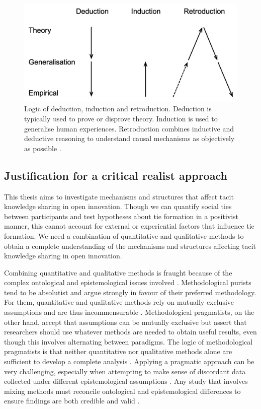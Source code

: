 \begin{figure}[h!]
\centering
\includegraphics[width=0.7\linewidth]{Images/retroduction.png}
\caption[Logic of deduction, induction and retroduction]{Logic of deduction, induction and retroduction. Deduction is typically used to prove or disprove theory. Induction is used to generalise human experiences. Retroduction combines inductive and deductive reasoning to understand causal mechanisms as objectively as possible \citep{saether1998retroduction}.}
\label{fig:retroduction}
\end{figure}

\subsection{Justification for a critical realist approach}

This thesis aims to investigate mechanisms and structures that affect tacit knowledge sharing in open innovation. Though we can quantify social ties between participants and test hypotheses about tie formation in a positivist manner, this cannot account for external or experiential factors that influence tie formation. We need a combination of quantitative and qualitative methods to obtain a complete understanding of the mechanisms and structures affecting tacit knowledge sharing in open innovation. \medskip

Combining quantitative and qualitative methods is fraught because of the complex ontological and epistemological issues involved \citep{giddings2006mixed,mcevoy2006critical}. Methodological purists tend to be absolutist and argue strongly in favour of their preferred methodology. For them, quantitative and qualitative methods rely on mutually exclusive assumptions and are thus incommensurable \citep{greene2008mixed}. Methodological pragmatists, on the other hand, accept that assumptions can be mutually exclusive but assert that researchers should use whatever methods are needed to obtain useful results, even though this involves alternating between paradigms. The logic of methodological pragmatists is that neither quantitative nor qualitative methods alone are sufficient to develop a complete analysis \citep{mcevoy2006critical,creswell2013research}. Applying a pragmatic approach can be very challenging, especially when attempting to make sense of discordant data collected under different epistemological assumptions \citep{johnson2004mixed,giddings2006mixed}. Any study that involves mixing methods must reconcile ontological and epistemological differences to ensure findings are both credible and valid \citep{zachariadis2013methodological}. \medskip

